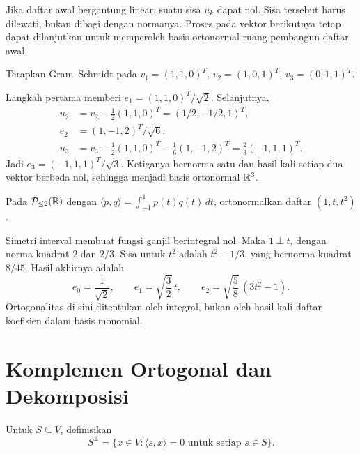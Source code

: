 Jika daftar awal bergantung linear, suatu sisa $u_k$ dapat nol.
Sisa tersebut harus dilewati, bukan dibagi dengan normanya.
Proses pada vektor berikutnya tetap dapat dilanjutkan untuk
memperoleh basis ortonormal ruang pembangun daftar awal.

\begin{exam}
    Terapkan Gram--Schmidt pada
    $v_1=(1,1,0)^T$, $v_2=(1,0,1)^T$, $v_3=(0,1,1)^T$.
\end{exam}
\begin{solution}
    Langkah pertama memberi $e_1=(1,1,0)^T/\sqrt2$.
    Selanjutnya,
    \begin{align*}
        u_2&=v_2-\tfrac12(1,1,0)^T=(1/2,-1/2,1)^T,\\
        e_2&=(1,-1,2)^T/\sqrt6,\\
        u_3&=v_3-\tfrac12(1,1,0)^T-\tfrac16(1,-1,2)^T
             =\tfrac23(-1,1,1)^T.
    \end{align*}
    Jadi $e_3=(-1,1,1)^T/\sqrt3$.
    Ketiganya bernorma satu dan hasil kali setiap dua vektor
    berbeda nol, sehingga menjadi basis ortonormal $\mathbb{R}^3$.
\end{solution}

\begin{exam}
    Pada $\mathcal P_{\le2}(\mathbb{R})$ dengan
    $\langle p,q\rangle=\int_{-1}^1p(t)q(t)\,dt$,
    ortonormalkan daftar $(1,t,t^2)$.
\end{exam}
\begin{solution}
    Simetri interval membuat fungsi ganjil berintegral nol.
    Maka $1\perp t$, dengan norma kuadrat $2$ dan $2/3$.
    Sisa untuk $t^2$ adalah $t^2-1/3$, yang bernorma kuadrat $8/45$.
    Hasil akhirnya adalah
    \[
        e_0=\frac1{\sqrt2},\qquad
        e_1=\sqrt{\frac32}\,t,\qquad
        e_2=\sqrt{\frac58}\,(3t^2-1).
    \]
    Ortogonalitas di sini ditentukan oleh integral, bukan oleh
    hasil kali daftar koefisien dalam basis monomial.
\end{solution}

\section{Komplemen Ortogonal dan Dekomposisi}

\begin{definisi}
    Untuk $S\subseteq V$, definisikan
    \[
        S^\perp=\{x\in V:\langle s,x\rangle=0
            \text{ untuk setiap }s\in S\}.
    \]
\end{definisi}

